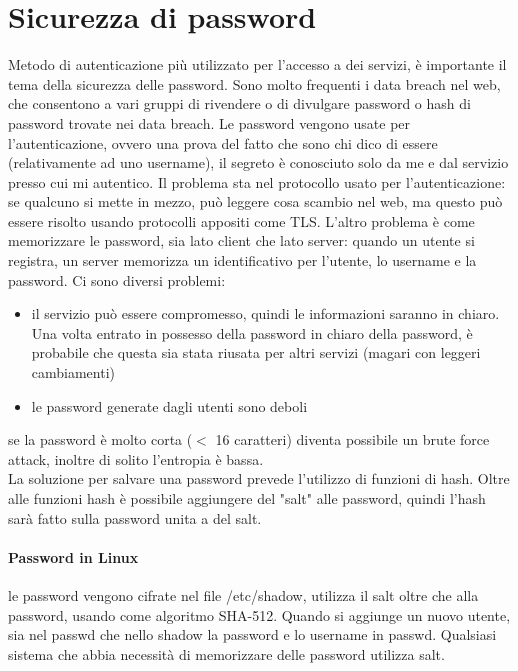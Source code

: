 \documentclass{article}
\begin{document}
\section{Sicurezza di password}
Metodo di autenticazione più utilizzato per l'accesso a dei servizi, è importante il tema della sicurezza delle password. Sono molto frequenti i data breach nel web, che consentono a vari gruppi di rivendere o di divulgare password o hash di password trovate nei data breach. Le password vengono usate per l'autenticazione, ovvero una prova del fatto che sono chi dico di essere (relativamente ad uno username), il segreto è conosciuto solo da me e dal servizio presso cui mi autentico. Il problema sta nel protocollo usato per l'autenticazione: se qualcuno si mette in mezzo, può leggere cosa scambio nel web, ma questo può essere risolto usando protocolli appositi come TLS. L'altro problema è come memorizzare le password, sia lato client che lato server: quando un utente si registra, un server memorizza un identificativo per l'utente, lo username e la password. Ci sono diversi problemi:
\begin{itemize}
\item il servizio può essere compromesso, quindi le informazioni saranno in chiaro. Una volta entrato in possesso della password in chiaro della password, è probabile che questa sia stata riusata per altri servizi (magari con leggeri cambiamenti)
\item le password generate dagli utenti sono deboli
\end{itemize}
se la password è molto corta ($<$ 16 caratteri) diventa possibile un brute force attack, inoltre di solito l'entropia è bassa.\\ La soluzione per salvare una password prevede l'utilizzo di funzioni di hash. Oltre alle funzioni hash è possibile aggiungere del "salt" alle password, quindi l'hash sarà fatto sulla password unita a del salt.
\paragraph{Password in Linux}le password vengono cifrate nel file \textsf{/etc/shadow}, utilizza il salt oltre che alla password, usando come algoritmo SHA-512. Quando si aggiunge un nuovo utente, sia nel passwd che nello shadow la password e lo username in passwd. Qualsiasi sistema che abbia necessità di memorizzare delle password utilizza salt.
\end{document}
